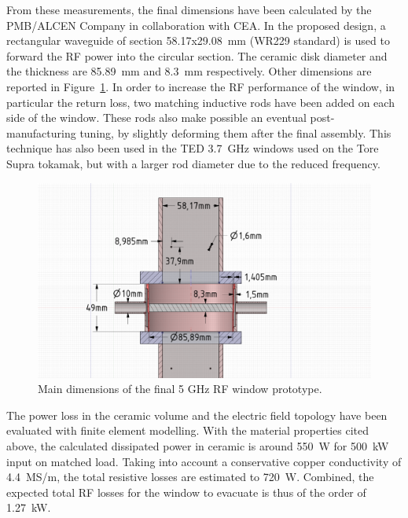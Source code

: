 From these measurements, the final dimensions have been calculated by the PMB/ALCEN Company in collaboration with CEA. In the proposed design, a rectangular waveguide of section 58.17x29.08~\si{mm} (WR229 standard) is used to forward the RF power into the circular section. The ceramic disk diameter and the thickness are 85.89~mm and 8.3~mm respectively. Other dimensions are reported in Figure~\ref{fig:iterwindowsmaindimensions}. In order to increase the RF performance of the window, in particular the return loss, two matching inductive rods have been added on each side of the window. These rods also make possible an eventual post-manufacturing tuning, by slightly deforming them after the final assembly. This technique has also been used in the TED 3.7~GHz windows used on the Tore Supra tokamak, but with a larger rod diameter due to the reduced frequency. 

\begin{figure}
	\centering
	\includegraphics[width=1.0\linewidth]{figures/chap3/ITER_window/ITER_windows_main_dimensions}
	\caption{Main dimensions of the final 5 GHz RF window prototype. }
	\label{fig:iterwindowsmaindimensions}
\end{figure}

The power loss in the ceramic volume and the electric field topology have been evaluated with finite element modelling. With the material properties cited above, the calculated dissipated power in ceramic is around 550~W for 500~kW input on matched load. Taking into account a conservative copper conductivity of 4.4~MS/m, the total resistive losses are estimated to 720~W. Combined, the expected total RF losses for the window to evacuate is thus of the order of 1.27~kW. 

